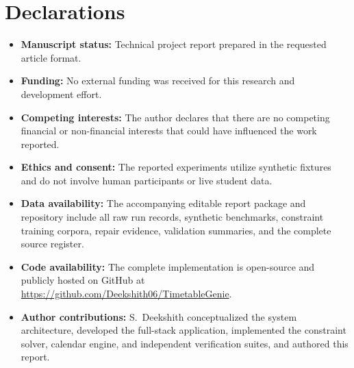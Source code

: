 \documentclass[pdflatex,sn-mathphys-num]{sn-jnl}
\theoremstyle{thmstyleone}
\theoremstyle{thmstyletwo}
\theoremstyle{thmstylethree}
\begin{document}
\section*{Declarations}
\begin{itemize}
\item \textbf{Manuscript status:} Technical project report prepared in the requested article format.
\item \textbf{Funding:} No external funding was received for this research and development effort.
\item \textbf{Competing interests:} The author declares that there are no competing financial or non-financial interests that could have influenced the work reported.
\item \textbf{Ethics and consent:} The reported experiments utilize synthetic fixtures and do not involve human participants or live student data.
\item \textbf{Data availability:} The accompanying editable report package and repository include all raw run records, synthetic benchmarks, constraint training corpora, repair evidence, validation summaries, and the complete source register.
\item \textbf{Code availability:} The complete implementation is open-source and publicly hosted on GitHub at \url{https://github.com/Deekshith06/TimetableGenie}.
\item \textbf{Author contributions:} S.~Deekshith conceptualized the system architecture, developed the full-stack application, implemented the constraint solver, calendar engine, and independent verification suites, and authored this report.
\end{itemize}
\end{document}
